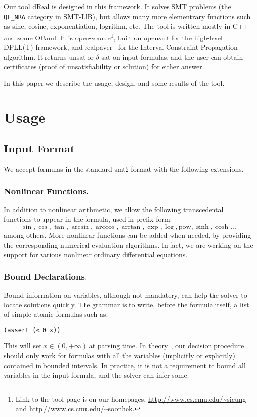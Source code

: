 \documentclass[envcountsect]{llncs}
\begin{document}
Our tool {\sf dReal} is designed in this framework. It solves SMT problems
(the {\tt QF\_NRA} category in SMT-LIB), but allows many more elementrary
functions such as sine, cosine, exponentiation, logrithm, etc. The tool is
written mostly in C++ and some OCaml. It is open-source\footnote{Link to the
tool page is on our homepages, \url{http://www.cs.cmu.edu/~sicung} and
\url{http://www.cs.cmu.edu/~soonhok}.
}, built on {\sf opensmt}\cite{DBLP:conf/tacas/BruttomessoPST10} for the
high-level DPLL(T) framework, and {\sf
realpaver}~\cite{DBLP:journals/toms/GranvilliersB06} for the Interval
Constraint Propagation algorithm. It returns {\sf unsat} or {\sf $\delta$-sat}
on input formulas, and the user can obtain certificates (proof of
unsatisfiability or solution) for either answer.

In this paper we describe the usage, design, and some results of the tool.

\section{Usage}

\subsection{Input Format}

We accept formulas in the standard {\sf smt2} format with the following
extensions.

\subsubsection{Nonlinear Functions.} In addition to nonlinear arithmetic, we
allow the following transcedental functions to appear in the formula, used in
prefix form.
 $$\sin, \cos, \tan, \arcsin, \arccos, \arctan, \exp, \log, \mbox{pow}, \sinh,
\cosh ... $$
among others. More nonlinear functions can be added when needed, by providing
the corresponding numerical evaluation algorithms. In fact, we are working on
the support for various nonlinear ordinary differential equations.

\subsubsection{Bound Declarations.} Bound information on variables, although not
mandatory, can help the solver to locate solutions quickly. The grammar is to
write, before the formula itself, a list of simple atomic formulas such as:
\begin{verbatim}
(assert (< 0 x))
\end{verbatim}
This will set $x\in (0, +\infty)$ at parsing time. In theory~\cite{}, our
decision procedure should only work for formulas with all the variables
(implicitly or explicitly) contained in bounded intervals. In practice, it is
not a requirement to bound all variables in the input formula, and the solver
can infer some.
\end{document}
